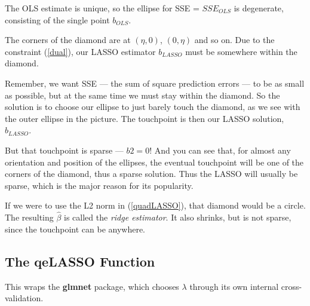 The OLS estimate is unique, so the ellipse for SSE = $SSE_{OLS}$ is
degenerate, consisting of the single point $b_{OLS}$.

The corners of the diamond are at $(\eta,0)$, $(0,\eta)$ and so on.  Due
to the constraint (\ref{dual}), our LASSO estimator $b_{LASSO}$
must be somewhere within the diamond.

Remember, we want SSE --- the sum of square prediction errors --- to be
as small as possible, but at the same time we must stay within the
diamond.  So the solution is to choose our ellipse to just barely touch
the diamond, as we see with the outer ellipse in the picture.  The
touchpoint is then our LASSO solution, $b_{LASSO}$.

But that touchpoint is sparse --- $b2 = 0$!  And you can see that, for
almost any orientation and position of the ellipses, the eventual
touchpoint will be one of the corners of the diamond, thus a sparse
solution.  Thus the LASSO will usually be sparse, which is the major
reason for its popularity.

If we were to use the L2 norm in (\ref{quadLASSO}), that diamond would
be a circle.  The resulting $\widehat{\beta}$ is called the
\textit{ridge estimator}.  It also shrinks, but is not sparse, since the
touchpoint can be anywhere.

\subsection{The qeLASSO Function}

This wraps the \textbf{glmnet} package, which chooses $\lambda$ through
its own internal cross-validation.

